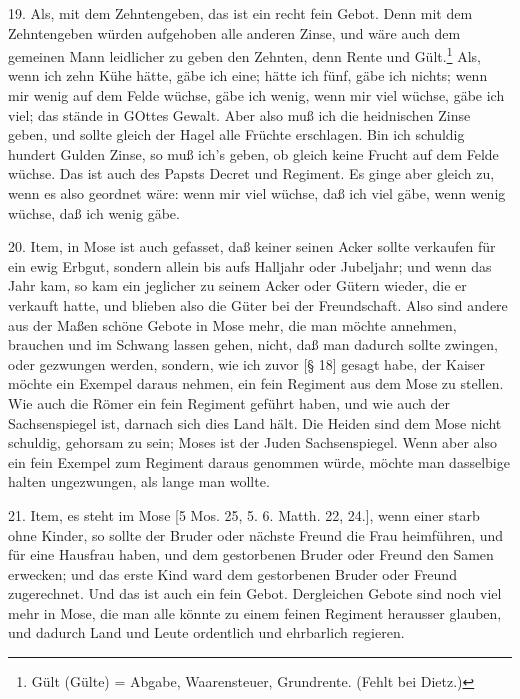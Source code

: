 19. Als, mit dem Zehntengeben, das ist ein recht fein Gebot. Denn mit dem Zehntengeben würden aufgehoben alle anderen Zinse, und wäre auch dem gemeinen Mann leidlicher zu geben den Zehnten, denn Rente und Gült.\footnote{Gült (Gülte) = Abgabe, Waarensteuer, Grundrente. (Fehlt bei Dietz.)} Als, wenn ich zehn Kühe hätte, gäbe ich eine; hätte ich fünf, gäbe ich nichts; wenn mir wenig auf dem Felde wüchse, gäbe ich wenig, wenn mir viel wüchse, gäbe ich viel; das stände in GOttes Gewalt. Aber also muß ich die heidnischen Zinse geben, und sollte gleich der Hagel alle Früchte erschlagen. Bin ich schuldig hundert Gulden Zinse, so muß ich’s geben, ob gleich keine Frucht auf dem Felde wüchse. Das ist auch des Papsts Decret und Regiment. Es ginge aber gleich zu, wenn es also geordnet wäre: wenn mir viel wüchse, daß ich viel gäbe, wenn wenig wüchse, daß ich wenig gäbe.

20. Item, in Mose ist auch gefasset, daß keiner seinen Acker sollte verkaufen für ein ewig Erbgut, sondern allein bis aufs Halljahr oder Jubeljahr; und wenn das Jahr kam, so kam ein jeglicher zu seinem Acker oder Gütern wieder, die er verkauft hatte, und blieben also die Güter bei der Freundschaft. Also sind andere aus der Maßen schöne Gebote in Mose mehr, die man möchte annehmen, brauchen und im Schwang lassen gehen, nicht, daß man dadurch sollte zwingen, oder gezwungen werden, sondern, wie ich zuvor [§ 18] gesagt habe, der Kaiser möchte ein Exempel daraus nehmen, ein fein Regiment aus dem Mose zu stellen. Wie auch die Römer ein fein Regiment geführt haben, und wie auch der Sachsenspiegel ist, darnach sich dies Land hält. Die Heiden sind dem Mose nicht schuldig, gehorsam zu sein; Moses ist der Juden Sachsenspiegel. Wenn aber also ein fein Exempel zum Regiment daraus genommen würde, möchte man dasselbige halten ungezwungen, als lange man wollte.

21. Item, es steht im Mose [5 Mos. 25, 5. 6. Matth. 22, 24.], wenn einer starb ohne Kinder, so sollte der Bruder oder nächste Freund die Frau heimführen, und für eine Hausfrau haben, und dem gestorbenen Bruder oder Freund den Samen erwecken; und das erste Kind ward dem gestorbenen Bruder oder Freund zugerechnet. Und das ist auch ein fein Gebot. Dergleichen Gebote sind noch viel mehr in Mose, die man alle könnte zu einem feinen Regiment herausser glauben, und dadurch Land und Leute ordentlich und ehrbarlich regieren.

